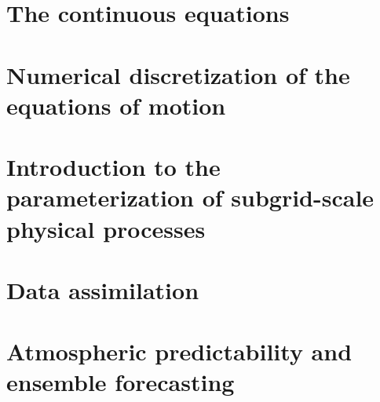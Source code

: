 \section{The continuous equations}
\label{sec:kalnay:continuous_equations}

\section{Numerical discretization of the equations of motion}
\label{sec:kalnay:numerical_discretization}

\section{Introduction to the parameterization of subgrid-scale physical processes}
\label{sec:kalnay:parameterization}

\section{Data assimilation}
\label{sec:kalnay:data_assimilation}

\section{Atmospheric predictability and ensemble forecasting}
\label{sec:kalnay:predictability}
